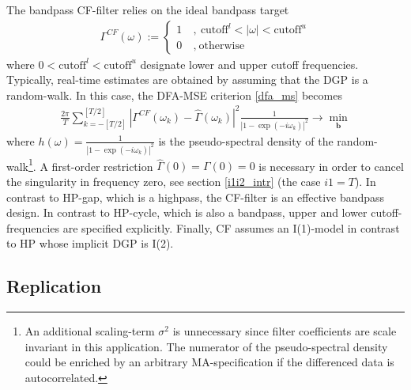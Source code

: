 \documentclass[a4paper]{book}
\begin{document}
The bandpass CF-filter relies on the ideal bandpass target
\begin{eqnarray*}
\Gamma^{CF}(\omega):=\left\{\begin{array}{cc}1~&,~\textrm{cutoff}^l<|\omega|<\textrm{cutoff}^u\\
0~&,~\textrm{otherwise}\end{array}\right.
\end{eqnarray*}
where $0<\textrm{cutoff}^l<\textrm{cutoff}^u$ designate lower and upper cutoff frequencies. 
Typically, real-time estimates are obtained by assuming that the DGP is  a random-walk. In this case, the DFA-MSE criterion \ref{dfa_ms} becomes
\begin{eqnarray}
\frac{2\pi}{T}\sum_{k=-[T/2]}^{[T/2]}\left|\Gamma^{CF}(\omega_k)-\hat{\Gamma}(\omega_k) \right|^2 \frac{1}{|1-\exp(-i\omega_k)|^2}\to\min_{\mathbf{b}}\label{dfa_ms_cf_cycle}
\end{eqnarray}
where $h(\omega)=\displaystyle{\frac{1}{|1-\exp(-i\omega_k)|^2}}$ is the pseudo-spectral density of the random-walk\footnote{An additional scaling-term $\sigma^2$ is unnecessary since filter coefficients are scale invariant in this application. The numerator of the pseudo-spectral density could be enriched by an arbitrary MA-specification if the differenced data is autocorrelated.}. A first-order restriction $\hat{\Gamma}(0)=\Gamma(0)=0$ is necessary in order to  cancel the singularity in frequency zero, see section \ref{i1i2_intr} (the case $i1=T$). In contrast to HP-gap, which is a highpass, the CF-filter is an effective bandpass design. In contrast to HP-cycle, which is also a bandpass, upper and lower cutoff-frequencies are specified explicitly. Finally, CF assumes an I(1)-model in contrast to HP whose implicit DGP is I(2).


\subsection{Replication}
\end{document}
